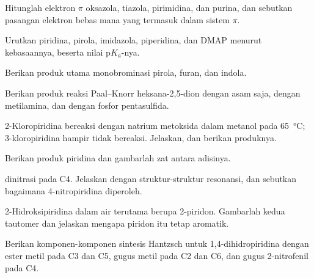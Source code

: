 \begin{exercise}[$\star$]\label{exo:b3:heterocycles:1}
Hitunglah elektron $\pi$ oksazola, tiazola, pirimidina, dan purina, dan sebutkan pasangan elektron bebas
mana yang termasuk dalam sistem $\pi$.
\end{exercise}

\begin{exercise}[$\star$]\label{exo:b3:heterocycles:2}
Urutkan piridina, pirola, imidazola, piperidina, dan DMAP menurut kebasaannya, beserta
nilai $\mathrm pK_a$-nya.
\end{exercise}

\begin{exercise}[$\star$]\label{exo:b3:heterocycles:3}
Berikan produk utama monobrominasi pirola, furan, dan indola.
\end{exercise}

\begin{exercise}[$\star$]\label{exo:b3:heterocycles:4}
Berikan produk reaksi Paal--Knorr heksana-2,5-dion dengan asam saja,
dengan metilamina, dan dengan fosfor pentasulfida.
\end{exercise}

\begin{exercise}[$\star\star$]\label{exo:b3:heterocycles:5}
2-Kloropiridina bereaksi dengan natrium metoksida dalam metanol pada \qty{65}{\celsius}; 3-kloropiridina
hampir tidak bereaksi. Jelaskan, dan berikan produknya.
\end{exercise}

\begin{exercise}[$\star\star$]\label{exo:b3:heterocycles:6}
Berikan produk  piridina dan gambarlah zat antara
adisinya.
\end{exercise}

\begin{exercise}[$\star\star$]\label{exo:b3:heterocycles:7}
 dinitrasi pada C4. Jelaskan dengan struktur-struktur resonansi, dan sebutkan bagaimana
4-nitropiridina diperoleh.
\end{exercise}

\begin{exercise}[$\star\star$]\label{exo:b3:heterocycles:8}
2-Hidroksipiridina dalam air terutama berupa 2-piridon. Gambarlah kedua tautomer dan
jelaskan mengapa piridon itu tetap aromatik.
\end{exercise}

\begin{exercise}[$\star\star$]\label{exo:b3:heterocycles:9}
Berikan komponen-komponen sintesis Hantzsch untuk 1,4-dihidropiridina dengan
ester metil pada C3 dan C5, gugus metil pada C2 dan C6, dan gugus 2-nitrofenil
pada C4.
\end{exercise}

